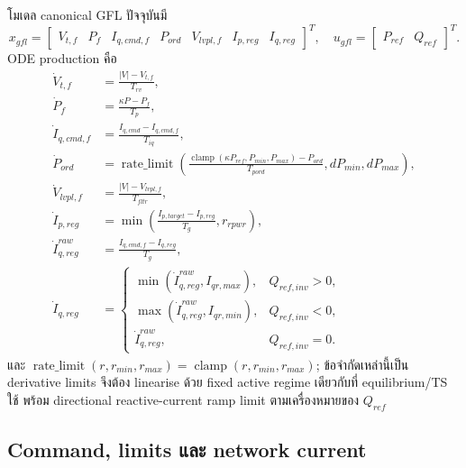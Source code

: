 \documentclass[12pt,a4paper]{article}
\newcommand{\clamp}{\operatorname{clamp}}
\begin{document}
โมเดล canonical GFL ปัจจุบันมี
\begin{equation}
x_{gfl}=\begin{bmatrix}V_{t,f}&P_f&I_{q,cmd,f}&P_{ord}&V_{lvpl,f}&I_{p,reg}&I_{q,reg}\end{bmatrix}^{T},
\quad u_{gfl}=\begin{bmatrix}P_{ref}&Q_{ref}\end{bmatrix}^{T}.
\end{equation}
ODE production คือ
\begin{align}
\dot V_{t,f}&=\frac{|V|-V_{t,f}}{T_{rv}},\\
\dot P_f&=\frac{\kappa P-P_f}{T_p},\\
\dot I_{q,cmd,f}&=\frac{I_{q,cmd}-I_{q,cmd,f}}{T_{iq}},\\
\dot P_{ord}&=\operatorname{rate\_limit}\!\left(
\frac{\clamp(\kappa P_{ref},P_{min},P_{max})-P_{ord}}{T_{pord}},
dP_{min},dP_{max}\right),\\
\dot V_{lvpl,f}&=\frac{|V|-V_{lvpl,f}}{T_{fltr}},\\
\dot I_{p,reg}&=\min\!\left(\frac{I_{p,target}-I_{p,reg}}{T_g},r_{rpwr}\right),\\
\dot I_{q,reg}^{raw}&=\frac{I_{q,cmd,f}-I_{q,reg}}{T_g},\\
\dot I_{q,reg}&=\begin{cases}
\min(\dot I_{q,reg}^{raw},I_{qr,max}),&Q_{ref,inv}>0,\\
\max(\dot I_{q,reg}^{raw},I_{qr,min}),&Q_{ref,inv}<0,\\
\dot I_{q,reg}^{raw},&Q_{ref,inv}=0.
\end{cases}
\end{align}
และ $\operatorname{rate\_limit}(r,r_{min},r_{max})=\clamp(r,r_{min},r_{max})$;
ข้อจำกัดเหล่านี้เป็น derivative limits จึงต้อง linearise ด้วย fixed active regime
เดียวกับที่ equilibrium/TS ใช้
พร้อม directional reactive-current ramp limit ตามเครื่องหมายของ $Q_{ref}$

\subsection{Command, limits และ network current}
\end{document}
